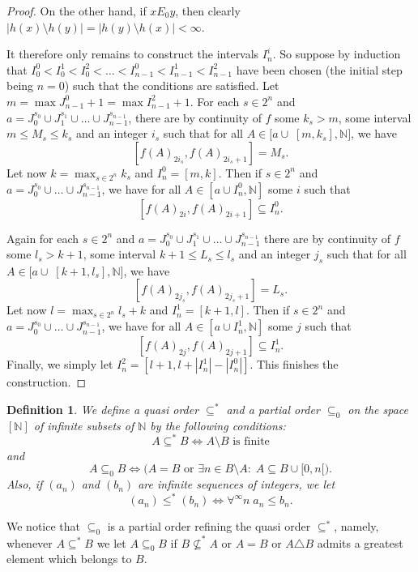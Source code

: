 \documentclass[10pt]{amsart}
\numberwithin{equation}{section}
\newtheorem{defi} [thm] {Definition}
\begin{document}
\begin{proof}
On the other hand, if $xE_0y$, then clearly  $|h(x)\setminus
h(y)|=|h(y)\setminus h(x)|<\infty$.

It therefore only remains to construct the intervals $I_n^i$. So suppose by
induction that $I_0^0<I_0^1<I_0^2<\ldots<I_{n-1}^0<I_{n-1}^1<I_{n-1}^2$ have
been chosen (the initial step being $n=0$) such that the conditions are
satisfied. Let $m=\max J_{n-1}^0+1=\max I_{n-1}^2+1$. For each $s\in 2^n$ and
$a=J_0^{s_0}\cup J_1^{s_1}\cup\ldots \cup J_{n-1}^{s_{n-1}}$, there are by
continuity of $f$  some $k_s>m$, some interval $m{\ensuremath{\leqslant}} M_s{\ensuremath{\leqslant}} k_s$ and an
integer $i_s$ such that for all $A\in \big[a\cup\; [m,k_s],{\mathbb N}\big]$, we have $$
[f(A)_{2i_s},f(A)_{2i_s+1}]=M_s.
$$
Let now $k=\max_{s\in 2^n}k_s$ and $I_n^0=[m,k]$. Then if  $s\in 2^n$ and
$a=J_0^{s_0}\cup \ldots \cup J_{n-1}^{s_{n-1}}$, we have for all $A\in [a\cup
I_n^0,{\mathbb N}]$ some $i$ such that
$$
[f(A)_{2i},f(A)_{2i+1}]\subseteq I_n^0.
$$

Again for each $s\in 2^n$ and $a=J_0^{s_0}\cup J_1^{s_1}\cup\ldots \cup
J_{n-1}^{s_{n-1}}$ there are by continuity of $f$  some $l_s>k+1$, some
interval $k+1{\ensuremath{\leqslant}} L_s{\ensuremath{\leqslant}} l_s$ and an integer $j_s$ such that for all $A\in
\big[a\cup\; [k+1,l_s],{\mathbb N}\big]$, we have
$$
[f(A)_{2j_s},f(A)_{2j_s+1}]=L_s.
$$
Let now $l=\max_{s\in 2^n}l_s+k$ and $I_n^1=[k+1,l]$. Then if  $s\in 2^n$ and
$a=J_0^{s_0}\cup \ldots \cup J_{n-1}^{s_{n-1}}$, we have for all $A\in [a\cup
I_n^1,{\mathbb N}]$ some $j$ such that
$$
[f(A)_{2j},f(A)_{2j+1}]\subseteq I_n^1.
$$
Finally, we simply let $I_n^2=[l+1,l+|I_n^1|-|I_n^0|]$. This finishes the
construction.
\end{proof}

\begin{defi}
We define a quasi order $\subseteq^*$ and a partial order $\subseteq_0$ on the
space $[{\mathbb N}]$ of infinite subsets of ${\mathbb N}$ by the following conditions:
$$
A\subseteq^* B{\Leftrightarrow} A\setminus B \textrm{ is finite}
$$
and
$$
A\subseteq_0 B{\Leftrightarrow} \Big(A=B \textrm { or }{\exists} n\in B\setminus A\colon\; A\subseteq B\cup [0,n[\Big).
$$
Also, if $(a_n)$ and $(b_n)$ are infinite sequences of integers, we let
$$
(a_n){\ensuremath{\leqslant}}^*(b_n){\Leftrightarrow} {\forall}^\infty n\; a_n{\ensuremath{\leqslant}} b_n.
$$
\end{defi}
We notice that $\subseteq_0$ is a partial order refining the quasi order
$\subseteq^*$, namely, whenever $A\subseteq^*B$ we let $A\subseteq_0B$ if $B
\not\subseteq^* A$ or $A=B$ or  $A\triangle B$ admits a greatest element which
belongs to $B$.
\end{document}
